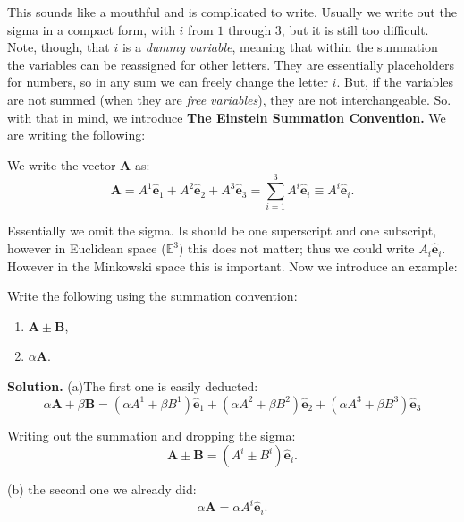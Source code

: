 \documentclass[../main.tex]{subfiles}
\begin{document}
	This sounds like a mouthful and is complicated to write. Usually we write out the sigma in a compact form, with $i$ from $1$ through $3$, but it is still too difficult. Note, though, that $i$ is a \textit{dummy variable}, meaning that within the summation the variables can be reassigned for other letters. They are essentially placeholders for numbers, so in any sum we can freely change the letter $i$. But, if the variables are not summed (when they are \textit{free variables}), they are not interchangeable. So. with that in mind, we introduce \textbf{The Einstein Summation Convention.} We are writing the following:
	\begin{claim}
		We write the vector $\mathbf{A}$ as:
		\begin{equation}
		  \mathbf{A} = A^{1}\hat{\mathbf{e}}_1 + A^{2}\hat{\mathbf{e}}_2 + A^{3}\hat{\mathbf{e}}_3 = \sum_{i=1}^3 A^{i}\hat{\mathbf{e}}_{i} \equiv A^{i}\hat{\mathbf{e}}_{i}.
		\end{equation}
	\end{claim}

	Essentially we omit the sigma. Is should be one superscript and one subscript, however in Euclidean space ($\mathbb{E}^{3}$) this does not matter; thus we could write $A_{i}\hat{\mathbf{e}}_{i}$. However in the Minkowski space this is important. Now we introduce an example:
	\begin{example}
		Write the following using the summation convention:
		\begin{enumerate}
			\item {$\mathbf{A} \pm \mathbf{B}$,}
			\item {$\alpha \mathbf{A}$.}
		\end{enumerate}

		\vspace{1\baselineskip}
		\textbf{Solution.} (a)The first one is easily deducted:
		\begin{equation}
		  \alpha \mathbf{A} + \beta \mathbf{B} = (\alpha A^{1} + \beta B^{1})\hat{\mathbf{e}}_1 + (\alpha A^{2} + \beta B^{2})\hat{\mathbf{e}}_2 + (\alpha A^{3} + \beta B^{3})\hat{\mathbf{e}}_3
		\end{equation}

		Writing out the summation and dropping the sigma:
		\begin{equation}
		  \mathbf{A} \pm \mathbf{B} = (A^{i}\pm B^{i})\hat{\mathbf{e}}_{i}.
		\end{equation}

		(b) the second one we already did:
		\begin{equation}
		  \alpha \mathbf{A} = \alpha A^{i}\hat{\mathbf{e}}_{i}.
		\end{equation}
	\end{example}
\end{document}
